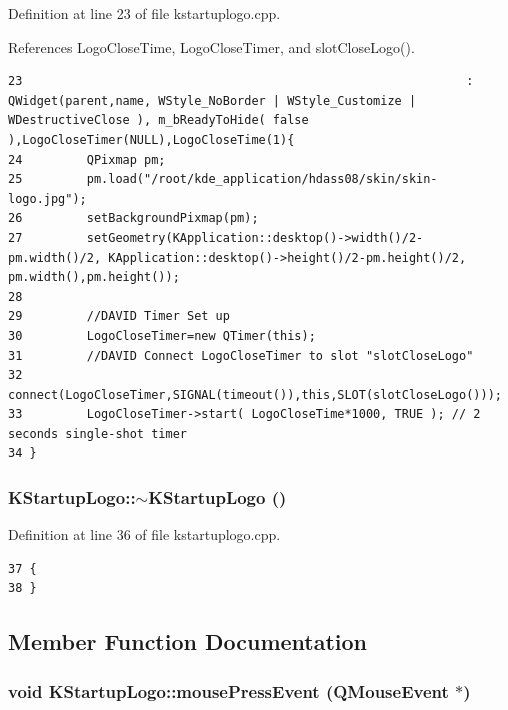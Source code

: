 Definition at line 23 of file kstartuplogo.cpp.

References Logo\-Close\-Time, Logo\-Close\-Timer, and slot\-Close\-Logo().



\footnotesize\begin{verbatim}23                                                              : QWidget(parent,name, WStyle_NoBorder | WStyle_Customize | WDestructiveClose ), m_bReadyToHide( false ),LogoCloseTimer(NULL),LogoCloseTime(1){
24         QPixmap pm;
25         pm.load("/root/kde_application/hdass08/skin/skin-logo.jpg");
26         setBackgroundPixmap(pm);
27         setGeometry(KApplication::desktop()->width()/2-pm.width()/2, KApplication::desktop()->height()/2-pm.height()/2, pm.width(),pm.height());
28         
29         //DAVID Timer Set up
30         LogoCloseTimer=new QTimer(this);
31         //DAVID Connect LogoCloseTimer to slot "slotCloseLogo"
32         connect(LogoCloseTimer,SIGNAL(timeout()),this,SLOT(slotCloseLogo()));
33         LogoCloseTimer->start( LogoCloseTime*1000, TRUE ); // 2 seconds single-shot timer
34 }
\end{verbatim}\normalsize 
{}
\subsubsection{\setlength{\rightskip}{0pt plus 5cm}KStartup\-Logo::$\sim${\bf KStartup\-Logo} ()}\label{classKStartupLogo_KStartupLogoa1}




Definition at line 36 of file kstartuplogo.cpp.



\footnotesize\begin{verbatim}37 {
38 }
\end{verbatim}\normalsize 


\subsection{Member Function Documentation}
\subsubsection{\setlength{\rightskip}{0pt plus 5cm}void KStartup\-Logo::mouse\-Press\-Event (QMouse\-Event $\ast$)\hspace{0.3cm}{\tt  [protected, virtual]}}\label{classKStartupLogo_KStartupLogob0}




